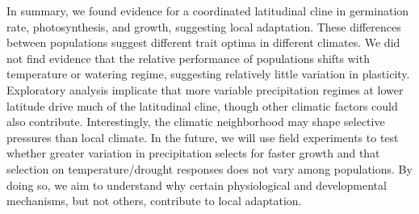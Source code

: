 \documentclass[11pt, oneside]{article}
\begin{document}
In summary, we found evidence for a coordinated latitudinal cline in germination rate, photosynthesis, and growth, suggesting local adaptation. These differences between populations suggest different trait optima in different climates. We did not find evidence that the relative performance of populations shifts with temperature or watering regime, suggesting relatively little variation in plasticity. Exploratory analysis implicate that more variable precipitation regimes at lower latitude drive much of the latitudinal cline, though other climatic factors could also contribute. Interestingly, the climatic neighborhood may shape selective pressures than local climate. In the future, we will use field experiments to test whether greater variation in precipitation selects for faster growth and that selection on temperature/drought responses does not vary among populations. By doing so, we aim to understand why certain physiological and developmental mechanisms, but not others, contribute to local adaptation.






\end{document}
